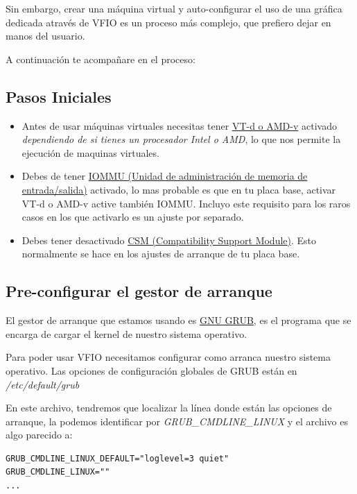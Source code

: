 \documentclass[12pt]{article}
\begin{document}
Sin embargo, crear una máquina virtual y auto-configurar el uso de una gráfica dedicada através de VFIO es un proceso más complejo, que prefiero dejar en manos del usuario.

A continuación te acompañare en el proceso:

\subsection{Pasos Iniciales}

\begin{itemize}
\setlength\itemsep{-0.2em}
\item Antes de usar máquinas virtuales necesitas tener \href{https://en.wikipedia.org/wiki/X86_virtualization#Intel-VT-d}{VT-d o AMD-v} activado \emph{dependiendo de si tienes un procesador Intel o AMD}, lo que nos permite la ejecución de maquinas virtuales.
\item Debes de tener \href{https://en.wikipedia.org/wiki/Input\%E2\%80\%93output_memory_management_unit}{IOMMU (Unidad de administración de memoria de entrada/salida)} activado, lo mas probable es que en tu placa base, activar VT-d o AMD-v active también IOMMU. Incluyo este requisito para los raros casos en los que activarlo es un ajuste por separado.
\item Debes tener desactivado \href{https://en.wikipedia.org/wiki/UEFI#CSM_booting}{CSM (Compatibility Support Module)}. Esto normalmente se hace en los ajustes de arranque de tu placa base.
\end{itemize}

\subsection{Pre-configurar el gestor de arranque}

El gestor de arranque que estamos usando es \href{https://es.wikipedia.org/wiki/GNU_GRUB}{GNU GRUB}, es el programa que se encarga de cargar el kernel de nuestro sistema operativo.

Para poder usar VFIO necesitamos configurar como arranca nuestro sistema operativo. Las opciones de configuración globales de GRUB están en \emph{/etc/default/grub}

En este archivo, tendremos que localizar la línea donde están las opciones de arranque, la podemos identificar por \emph{GRUB\_CMDLINE\_LINUX} y el archivo es algo parecido a:

\begin{verbatim}
GRUB_CMDLINE_LINUX_DEFAULT="loglevel=3 quiet"
GRUB_CMDLINE_LINUX=""
...
\end{verbatim}
\end{document}
